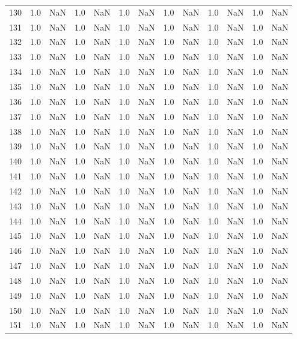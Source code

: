 \begin{tabular}{lrrrrrrrrrrrr}
130 & 1.0 & NaN & 1.0 & NaN & 1.0 & NaN & 1.0 & NaN & 1.0 & NaN & 1.0 & NaN \\
131 & 1.0 & NaN & 1.0 & NaN & 1.0 & NaN & 1.0 & NaN & 1.0 & NaN & 1.0 & NaN \\
132 & 1.0 & NaN & 1.0 & NaN & 1.0 & NaN & 1.0 & NaN & 1.0 & NaN & 1.0 & NaN \\
133 & 1.0 & NaN & 1.0 & NaN & 1.0 & NaN & 1.0 & NaN & 1.0 & NaN & 1.0 & NaN \\
134 & 1.0 & NaN & 1.0 & NaN & 1.0 & NaN & 1.0 & NaN & 1.0 & NaN & 1.0 & NaN \\
135 & 1.0 & NaN & 1.0 & NaN & 1.0 & NaN & 1.0 & NaN & 1.0 & NaN & 1.0 & NaN \\
136 & 1.0 & NaN & 1.0 & NaN & 1.0 & NaN & 1.0 & NaN & 1.0 & NaN & 1.0 & NaN \\
137 & 1.0 & NaN & 1.0 & NaN & 1.0 & NaN & 1.0 & NaN & 1.0 & NaN & 1.0 & NaN \\
138 & 1.0 & NaN & 1.0 & NaN & 1.0 & NaN & 1.0 & NaN & 1.0 & NaN & 1.0 & NaN \\
139 & 1.0 & NaN & 1.0 & NaN & 1.0 & NaN & 1.0 & NaN & 1.0 & NaN & 1.0 & NaN \\
140 & 1.0 & NaN & 1.0 & NaN & 1.0 & NaN & 1.0 & NaN & 1.0 & NaN & 1.0 & NaN \\
141 & 1.0 & NaN & 1.0 & NaN & 1.0 & NaN & 1.0 & NaN & 1.0 & NaN & 1.0 & NaN \\
142 & 1.0 & NaN & 1.0 & NaN & 1.0 & NaN & 1.0 & NaN & 1.0 & NaN & 1.0 & NaN \\
143 & 1.0 & NaN & 1.0 & NaN & 1.0 & NaN & 1.0 & NaN & 1.0 & NaN & 1.0 & NaN \\
144 & 1.0 & NaN & 1.0 & NaN & 1.0 & NaN & 1.0 & NaN & 1.0 & NaN & 1.0 & NaN \\
145 & 1.0 & NaN & 1.0 & NaN & 1.0 & NaN & 1.0 & NaN & 1.0 & NaN & 1.0 & NaN \\
146 & 1.0 & NaN & 1.0 & NaN & 1.0 & NaN & 1.0 & NaN & 1.0 & NaN & 1.0 & NaN \\
147 & 1.0 & NaN & 1.0 & NaN & 1.0 & NaN & 1.0 & NaN & 1.0 & NaN & 1.0 & NaN \\
148 & 1.0 & NaN & 1.0 & NaN & 1.0 & NaN & 1.0 & NaN & 1.0 & NaN & 1.0 & NaN \\
149 & 1.0 & NaN & 1.0 & NaN & 1.0 & NaN & 1.0 & NaN & 1.0 & NaN & 1.0 & NaN \\
150 & 1.0 & NaN & 1.0 & NaN & 1.0 & NaN & 1.0 & NaN & 1.0 & NaN & 1.0 & NaN \\
151 & 1.0 & NaN & 1.0 & NaN & 1.0 & NaN & 1.0 & NaN & 1.0 & NaN & 1.0 & NaN \\

\end{tabular}

